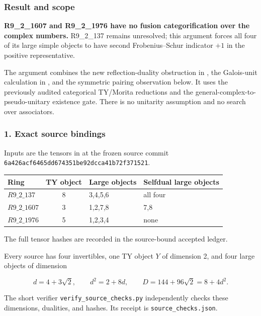 \hypertarget{frontier-result-and-scope}{%
\subsubsection{Result and scope}\label{frontier-result-and-scope}}

\textbf{R9\_2\_1607 and R9\_2\_1976 have no fusion categorification over
the complex numbers.} R9\_2\_137 remains unresolved; this argument
forces all four of its large simple objects to have second
Frobenius--Schur indicator \(+1\) in the positive representative.

The argument combines the new reflection-duality obstruction in
, the Galois-unit calculation in
, and the
symmetric pairing observation below. It uses the previously audited
categorical TY/Morita reductions and the
general-complex-to-pseudo-unitary existence gate. There is no unitarity
assumption and no search over associators.

\hypertarget{frontier-exact-source-bindings}{%
\subsubsection{1. Exact source bindings}\label{frontier-exact-source-bindings}}

Inputs are the tensors in  at
the frozen source commit
\texttt{6a426acf6465dd674351be92dcca41b72f371521}.

\begin{center}\begin{tabular}{lcll}\toprule
Ring & TY object & Large objects & Selfdual large objects\\\midrule
$R9\_2\_137$ & 8 & 3,4,5,6 & all four\\
$R9\_2\_1607$ & 3 & 1,2,7,8 & 7,8\\
$R9\_2\_1976$ & 5 & 1,2,3,4 & none\\\bottomrule
\end{tabular}\end{center}
The full tensor hashes are recorded in the source-bound accepted ledger.


Every source has four invertibles, one TY object \(Y\) of dimension 2,
and four large objects of dimension

\[
d=4+3\sqrt2,\qquad d^2=2+8d,\qquad
D=144+96\sqrt2=8+4d^2.
\]

The short verifier \texttt{verify\_source\_checks.py} independently
checks these dimensions, dualities, and hashes. Its receipt is
\texttt{source\_checks.json}.

